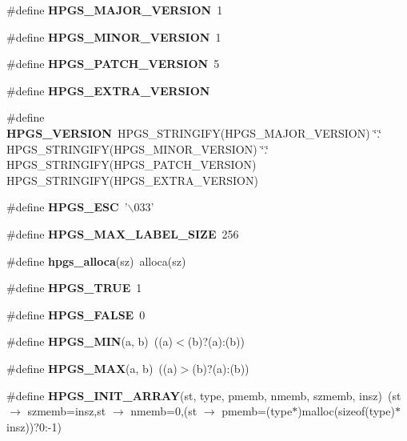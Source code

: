 \begin{CompactItemize}
\item 
\#define \textbf{HPGS\_\-MAJOR\_\-VERSION}~1\label{hpgs_8h_de7aab82ab56928ed6df6bdcedae807c}

\item 
\#define \textbf{HPGS\_\-MINOR\_\-VERSION}~1\label{hpgs_8h_550e3ba4c84b649b13558c4f36d86c7f}

\item 
\#define \textbf{HPGS\_\-PATCH\_\-VERSION}~5\label{hpgs_8h_668869e5cf929e18ca4d9c652547ac92}

\item 
\#define \textbf{HPGS\_\-EXTRA\_\-VERSION}\label{hpgs_8h_88170bea2b579797be141ac2053cbb5b}

\item 
\#define \textbf{HPGS\_\-VERSION}~HPGS\_\-STRINGIFY(HPGS\_\-MAJOR\_\-VERSION) \char`\"{}.\char`\"{} HPGS\_\-STRINGIFY(HPGS\_\-MINOR\_\-VERSION) \char`\"{}.\char`\"{} HPGS\_\-STRINGIFY(HPGS\_\-PATCH\_\-VERSION) HPGS\_\-STRINGIFY(HPGS\_\-EXTRA\_\-VERSION)\label{hpgs_8h_42f05b0655bb58990f90051848d2014f}

\item 
\#define \textbf{HPGS\_\-ESC}~'$\backslash$033'\label{hpgs_8h_f85c7694ffa01049f33b03cefde8471f}

\item 
\#define \textbf{HPGS\_\-MAX\_\-LABEL\_\-SIZE}~256\label{hpgs_8h_97fdfd742336d9c8d3087479ce300ecc}

\item 
\#define \textbf{hpgs\_\-alloca}(sz)~alloca(sz)\label{hpgs_8h_2cb07930a25ffa3bcd5254fa25d1ba3e}

\item 
\#define \textbf{HPGS\_\-TRUE}~1\label{group__base_ge0f1d05c80ae8bfc1042404f598edc5a}

\item 
\#define \textbf{HPGS\_\-FALSE}~0\label{group__base_g7550d077e74634032f51951a9c8efd76}

\item 
\#define \textbf{HPGS\_\-MIN}(a, b)~((a)$<$(b)?(a):(b))\label{group__base_g7286dad34df84df5fd05ce3d26920acb}

\item 
\#define \textbf{HPGS\_\-MAX}(a, b)~((a)$>$(b)?(a):(b))\label{group__base_gec5d7d39582cda4657e55bc03d8e46b6}

\item 
\#define \textbf{HPGS\_\-INIT\_\-ARRAY}(st, type, pmemb, nmemb, szmemb, insz)~(st $\rightarrow$ szmemb=insz,st $\rightarrow$ nmemb=0,(st $\rightarrow$ pmemb=(type$\ast$)malloc(sizeof(type)$\ast$insz))?0:-1)\label{group__base_g7c2f4a9472ff7fbb4bc8ae03dca95ee5}


\end{CompactItemize}
